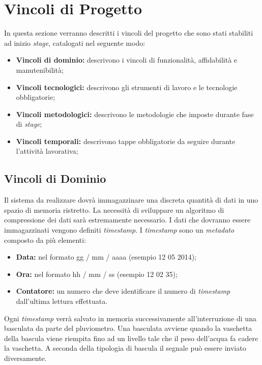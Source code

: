 \section{Vincoli di Progetto}

In questa sezione verranno descritti i vincoli del progetto che sono stati stabiliti ad inizio \textit{stage}, catalogati nel seguente modo:
\begin{itemize}
\item \textbf{Vincoli di dominio:} descrivono i vincoli di funzionalità, affidabilità e manutenibilità;
\item \textbf{Vincoli tecnologici:} descrivono gli strumenti di lavoro e le tecnologie obbligatorie;
\item \textbf{Vincoli metodologici:} descrivono le metodologie che imposte durante fase di \textit{stage};
\item \textbf{Vincoli temporali:} descrivono tappe obbligatorie da seguire durante l'attività lavorativa;
\end{itemize}

\subsection{Vincoli di Dominio}

Il sistema da realizzare dovrà immagazzinare una discreta quantità di dati in uno spazio di memoria ristretto. La necessità di sviluppare un algoritmo di compressione dei dati sarà estremamente necessario. I dati che dovranno essere immagazzinati vengono definiti \textit{timestamp}. I \textit{timestamp} sono un \textit{metadato} composto da più elementi:
\begin{itemize}
	\item \textbf{Data:} nel formato gg / mm / aaaa (esempio  12 05 2014);
	\item \textbf{Ora:} nel formato hh / mm / ss (esempio 12 02 35);
	\item \textbf{Contatore:} un numero che deve identificare il numero di \textit{timestamp} dall'ultima lettura effettuata.	
\end{itemize}

Ogni \textit{timestamp} verrà salvato in memoria successivamente all'interruzione di una basculata da parte del pluviometro. Una basculata avviene quando la vaschetta della bascula viene riempita fino ad un livello tale che il peso dell'acqua fa cadere la vaschetta. A seconda della tipologia di bascula il segnale può essere inviato diversamente. 

